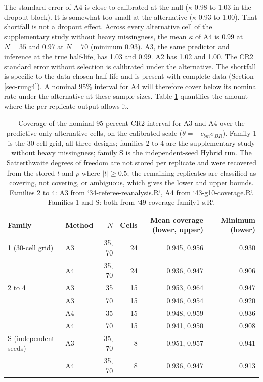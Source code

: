 \documentclass[
  11pt,
]{article}
\begin{document}
The standard error of A4 is close to calibrated at the null (\(\kappa\)
0.98 to
1.03 in the dropout block). It is
somewhat too small at the alternative (\(\kappa\)
0.93 to
1.00). That shortfall is not a dropout
effect. Across every alternative cell of the supplementary study
without heavy missingness, the mean \(\kappa\) of A4 is
0.99 at \(N = 35\) and
0.97 at \(N = 70\) (minimum
0.93). A3,
the same predictor and inference at the true half-life, has
1.03 and
0.99. A2 has
1.02 and
1.00. The CR2 standard error without
selection is calibrated under the alternative. The shortfall is
specific to the data-chosen half-life and is present with complete
data (Section \ref{sec-rung4}). A nominal 95\% interval for A4 will
therefore cover below its nominal rate under the alternative at these
sample sizes. Table \ref{tab:stage3-coverage} quantifies the amount
where the per-replicate output allows it.

\begin{table}
\centering
\caption{\label{tab:stage3-coverage}Coverage of the nominal 95 percent CR2 interval for A3
      and A4 over the predictive-only alternative cells, on the
      calibrated scale ($\theta = -c_{bm}\sigma_{BR}$). Family 1 is
      the 30-cell grid, all three designs; families 2 to 4 are the
      supplementary study without heavy missingness; family S is the
      independent-seed Hybrid run. The Satterthwaite degrees of
      freedom are not stored per replicate and were recovered from the
      stored $t$ and $p$ where $|t| \ge 0.5$; the remaining
      replicates are classified as covering, not covering, or
      ambiguous, which gives the lower and upper bounds. Families 2 to
      4: A3 from `34-referee-reanalysis.R`, A4 from
      `43-g10-coverage.R`. Families 1 and S: both from
      `49-coverage-family1-s.R`.}
\centering
\fontsize{9}{11}\selectfont
\begin{tabular}[t]{llrrrr}
\toprule
Family & Method & $N$ & Cells & Mean coverage (lower, upper) & Minimum (lower)\\
\midrule
1 (30-cell grid) & A3 & 35, 70 & 24 & 0.945, 0.956 & 0.930\\
 & A4 & 35, 70 & 24 & 0.936, 0.947 & 0.906\\
2 to 4 & A3 & 35 & 15 & 0.953, 0.964 & 0.947\\
 & A3 & 70 & 15 & 0.946, 0.954 & 0.920\\
 & A4 & 35 & 15 & 0.948, 0.959 & 0.936\\
 & A4 & 70 & 15 & 0.941, 0.950 & 0.908\\
S (independent seeds) & A3 & 35, 70 & 8 & 0.951, 0.957 & 0.941\\
 & A4 & 35, 70 & 8 & 0.936, 0.947 & 0.913\\
\bottomrule
\end{tabular}
\end{table}
\end{document}
